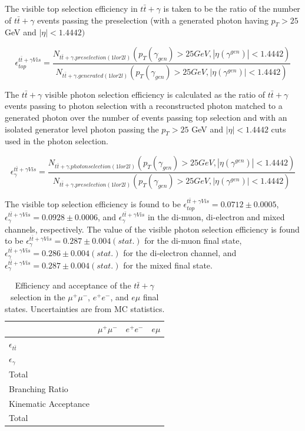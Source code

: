 The visible top selection efficiency in $t\bar{t}+\gamma$ is taken to be the ratio of the number of $t\bar{t}+\gamma$ events passing the preselection (with a generated photon having $p_T > 25$ GeV and $| \eta | < 1.4442)$

\begin{equation}
	\epsilon^{t\bar{t}+\gamma Vis}_{top} = \frac{N_{t\bar{t}+\gamma.preselection(1lor2l)}\left( p_T(\gamma_{gen}) > 25 GeV, |\eta(\gamma^{gen})| < 1.4442 \right)}{N_{t\bar{t}+\gamma.generated(1lor2l)}\left( p_T(\gamma_{gen}) > 25 GeV, |\eta(\gamma^{gen})| < 1.4442 \right)} 
\end{equation}

The $t\bar{t}+\gamma$ visible photon selection efficiency is calculated as the ratio of $t\bar{t}+\gamma$ events passing to photon selection with a reconstructed photon matched to a generated photon over the number of events passing top selection and with an isolated generator level photon passing the $p_T > 25$ GeV and $| \eta | < 1.4442$ cuts used in the photon selection.

\begin{equation}
	\epsilon^{t\bar{t}+\gamma Vis}_{\gamma} = \frac{N_{t\bar{t}+\gamma.photonselection(1lor2l)}\left( p_T(\gamma_{gen}) > 25 GeV, |\eta(\gamma^{gen})| < 1.4442 \right)}{N_{t\bar{t}+\gamma.preselection(1lor2l)}\left( p_T(\gamma_{gen}) > 25 GeV, |\eta(\gamma^{gen})| < 1.4442 \right)} 
\end{equation}

The visible top selection efficiency is found to be $\epsilon^{t\bar{t}+\gamma Vis}_{top} = 0.0712 \pm 0.0005$, $\epsilon^{t\bar{t}+\gamma Vis}_{\gamma} = 0.0928 \pm 0.0006$, and $\epsilon^{t\bar{t}+\gamma Vis}_{\gamma}$ in the di-muon, di-electron and mixed channels, respectively. The value of the visible photon selection efficiency is found to be $\epsilon^{t\bar{t}+\gamma Vis}_{\gamma} = 0.287 \pm 0.004 ( stat.)$ for the di-muon final state, $\epsilon^{t\bar{t}+\gamma Vis}_{\gamma} = 0.286 ± 0.004 (stat.)$ for the di-electron channel, and $\epsilon^{t\bar{t}+\gamma Vis}_{\gamma} = 0.287 \pm 0.004 ( stat.)$ for the mixed final state.

\begin{table}
\begin{center}
\begin{tabular}{l|ccc}
\hline
	 & \textbf{$\mu^+\mu^-$} & \textbf{$e^+e^-$} & \textbf{$e\mu$}  \\
\hline
	$\epsilon_{t\bar{t}}$ & & &  \\
	$\epsilon_{\gamma}$ & & &  \\
	Total &  & &  \\
\hline
	Branching Ratio & & &  \\
	Kinematic Acceptance & & & \\
	Total &  &  & \\
\hline	
\end{tabular}
\end{center}
\caption{Efficiency and acceptance of the $t\bar{t}+\gamma$ selection in the $\mu^+\mu^-$, $e^+e^-$, and $e\mu$ final states. Uncertainties are from MC statistics.}
\label{tab-efficiencyAndAcceptance}
\end{table}	